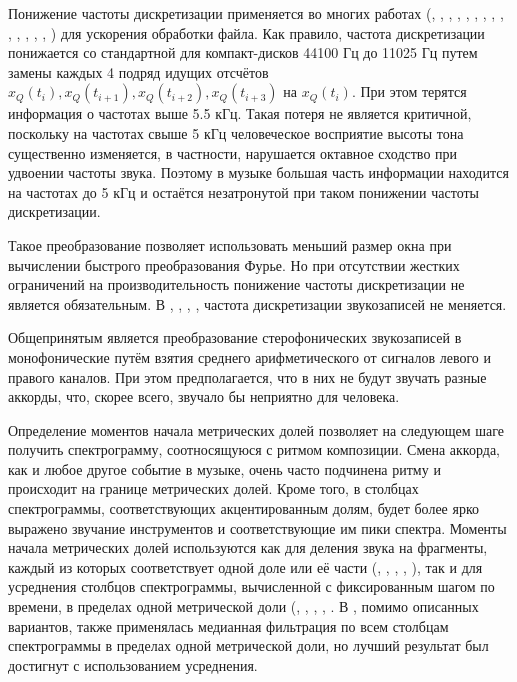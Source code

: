 Понижение частоты дискретизации применяется во многих работах
(\cite{Sheh2003}, \cite{Bello2005}, \cite{Lee2006}, \cite{Burgoyne2007},
\cite{Lee2007}, \cite{Papadopoulos2007}, \cite{Mauch2008},
\cite{Khadkevich2009}, \cite{Mauch2009}, \cite{Oudre2009}, \cite{Reed2009},
\cite{Mauch2010}, \cite{Khadkevich2011}, \cite{Ni2011}, \cite{Humphrey2012})
для ускорения обработки файла. Как правило, частота дискретизации понижается со
стандартной для компакт-дисков 44100 Гц до 11025 Гц путем замены каждых 4 подряд
идущих отсчётов $x_Q(t_i), x_Q(t_{i+1}), x_Q(t_{i+2}), x_Q(t_{i+3})$ на
$x_Q(t_i)$. При этом терятся информация о частотах выше 5.5 кГц. Такая потеря
не является критичной, поскольку на частотах свыше 5 кГц человеческое
восприятие высоты тона существенно изменяется, в частности, нарушается октавное
сходство при удвоении частоты звука. Поэтому в музыке большая часть информации
находится на частотах до 5 кГц и остаётся незатронутой при таком понижении
частоты дискретизации.

Такое преобразование позволяет использовать меньший размер окна при вычислении
быстрого преобразования Фурье. Но при отсутствии жестких ограничений на
производительность понижение частоты дискретизации не является обязательным. В
\cite{Zhang2008}, \cite{Cho2010}, \cite{Rocher2010}, \cite{Cho2011},
\cite{DeHaas2012} частота дискретизации звукозаписей не меняется.

Общепринятым является преобразование стерофонических звукозаписей в
монофонические путём взятия среднего арифметического от сигналов левого и
правого каналов. При этом предполагается, что в них не будут звучать разные
аккорды, что, скорее всего, звучало бы неприятно для человека.

Определение моментов начала метрических долей позволяет на следующем шаге
получить спектрограмму, соотносящуюся с ритмом композиции. Смена аккорда, как и
любое другое событие в музыке, очень часто подчинена ритму и происходит на
границе метрических долей. Кроме того, в столбцах спектрограммы, соответствующих
акцентированным долям, будет более ярко выражено звучание инструментов и
соответствующие им пики спектра. Моменты начала метрических долей используются
как для деления звука на фрагменты, каждый из которых соответствует одной доле
или её части (\cite{Yoshioka2004}, \cite{Sumi2008}, \cite{Weller2009},
\cite{Mcvicar2011}, \cite{Ni2011}), так и для усреднения столбцов спектрограммы,
вычисленной с фиксированным шагом по времени, в пределах одной метрической доли
(\cite{Bello2005}, \cite{Mauch2009}, \cite{Mauch2010}, \cite{DeHaas2012},
\cite{Chen2012}. В \cite{Chen2012}, помимо описанных вариантов, также
применялась медианная фильтрация по всем столбцам спектрограммы в пределах одной
метрической доли, но лучший результат был достигнут с использованием усреднения.

